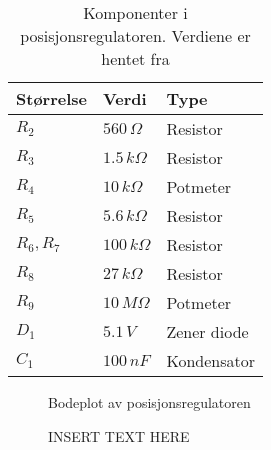 \begin{table}[h]
    \centering
    \caption{Komponenter i posisjonsregulatoren. Verdiene er hentet fra \cite{AnalogMotorlabbOppgaver}}
    \begin{tabular}{lll}
        \toprule
		Størrelse & Verdi & Type \\
		\midrule
        $R_2$ & $560\,\Omega$ & Resistor \\
        $R_3$ & $1.5\,k\Omega$ & Resistor\\
        $R_4$ & $10\,k\Omega$ & Potmeter\\
        $R_5$ & $5.6\,k\Omega$ & Resistor\\
        $R_6, R_7$ & $100\,k\Omega$ & Resistor\\
        $R_8$ & $27\,k\Omega$ & Resistor\\
        $R_9$ & $10\,M\Omega$ & Potmeter\\
        $D_1$ & $5.1\,V$ & Zener diode\\
        $C_1$ & $100\,nF$ & Kondensator\\
		\bottomrule
    \end{tabular}
    \label{tab:my_label}
\end{table}




\begin{figure}[h]
    \centering
    
    \caption{Bodeplot av posisjonsregulatoren}
    \label{fig:bodeplot}
\end{figure}

\begin{figure}
    \centering
    
    \caption{INSERT TEXT HERE}
    \label{fig:posisjon_P_regulator}
\end{figure}


























